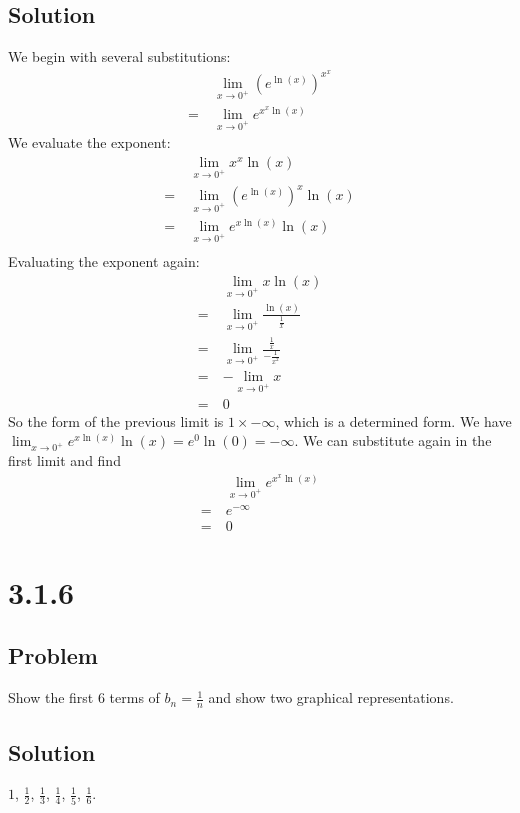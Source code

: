 \documentclass[12pt]{article}
\newcommand{\round}[1]{\left(       #1 \right)      }
\begin{document}
\subsection*{Solution}
We begin with several substitutions:
\begin{align*}
       & \lim_{x \to 0^+} \round{e^{\ln(x)}}^{x^x} \\
    =\ & \lim_{x \to 0^+} e^{x^x \ln(x)}
\end{align*}
We evaluate the exponent:
\begin{align*}
       & \lim_{x \to 0^+} x^x \ln(x) \\
    =\ & \lim_{x \to 0^+} \round{e^{\ln(x)}}^x \ln(x) \\
    =\ & \lim_{x \to 0^+} e^{x\ln(x)} \ln(x) \\
\end{align*}
Evaluating the exponent again:
\begin{align*}
       & \lim_{x \to 0^+} x \ln(x) \\
    =\ & \lim_{x \to 0^+} \frac{\ln(x)}{\frac{1}{x}} \\
    =\ & \lim_{x \to 0^+} \frac{\frac{1}{x}}{-\frac{1}{x^2}} \\
    =\ & -\lim_{x \to 0^+} x \\
    =\ & 0
\end{align*}
So the form of the previous limit is $1 \times -\infty$, which is a determined form. We have \\$\lim_{x \to 0^+} e^{x \ln(x)} \ln(x) = e^0 \ln(0) = -\infty$.
We can substitute again in the first limit and find
\begin{align*}
       & \lim_{x \to 0^+} e^{x^x \ln(x)} \\
    =\ & e^{-\infty} \\
    =\ & 0
\end{align*}



\section*{3.1.6}

\subsection*{Problem}
Show the first 6 terms of $b_n = \frac{1}{n}$ and show two graphical representations.

\subsection*{Solution}
$1$, $\frac{1}{2}$, $\frac{1}{3}$, $\frac{1}{4}$, $\frac{1}{5}$, $\frac{1}{6}$.
\end{document}
